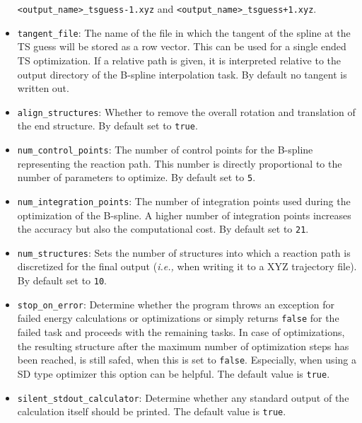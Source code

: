 \documentclass[]{tufte-book}
\begin{document}
\begin{itemize}
\texttt{<output\_name>\_tsguess-1.xyz} and  \texttt{<output\_name>\_tsguess+1.xyz}.
\item \texttt{tangent\_file}: The name of the file in which the tangent of the spline at the TS guess will be stored as a row vector.
This can be used for a single ended TS optimization. If a relative path is given, it is interpreted relative to the output directory
of the B-spline interpolation task. By default no tangent is written out.
\item \texttt{align\_structures}: Whether to remove the overall rotation and translation of the end structure. By
default set to \texttt{true}.
\item \texttt{num\_control\_points}: The number of control points for the B-spline representing the reaction path. This number
is directly proportional to the number of parameters to optimize. By default set to \texttt{5}.
\item \texttt{num\_integration\_points}: The number of integration points used during the optimization of the B-spline.
A higher number of integration points increases the accuracy but also the computational cost. By default set to \texttt{21}.
\item \texttt{num\_structures}: Sets the number of structures into which a reaction path is discretized for the final
output (\textit{i.e.,} when writing it to a XYZ trajectory file). By default set to \texttt{10}.
\item \texttt{stop\_on\_error}: Determine whether the program throws an exception for failed energy calculations or optimizations or simply returns \texttt{false} for the failed task and proceeds with the remaining tasks. In case of optimizations, the resulting structure after the maximum number of optimization steps has been reached, is still safed, when this is set to \texttt{false}. Especially, when using a SD type optimizer this option can be helpful. The default value is \texttt{true}.
\item \texttt{silent\_stdout\_calculator}: Determine whether any standard output of the calculation itself should be printed. The default value is \texttt{true}.
\end{itemize}
\end{document}
